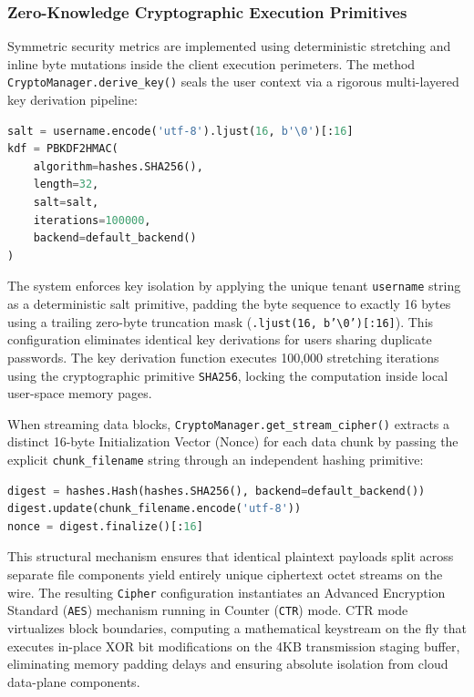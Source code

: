 \subsubsection{Zero-Knowledge Cryptographic Execution Primitives}
Symmetric security metrics are implemented using deterministic stretching and inline byte mutations inside the client execution perimeters. The method \texttt{CryptoManager.derive\_key()} seals the user context via a rigorous multi-layered key derivation pipeline:

\begin{lstlisting}[language=Python]
salt = username.encode('utf-8').ljust(16, b'\0')[:16]
kdf = PBKDF2HMAC(
    algorithm=hashes.SHA256(),
    length=32,
    salt=salt,
    iterations=100000,
    backend=default_backend()
)
\end{lstlisting}

The system enforces key isolation by applying the unique tenant \texttt{username} string as a deterministic salt primitive, padding the byte sequence to exactly 16 bytes using a trailing zero-byte truncation mask (\texttt{.ljust(16, b'\textbackslash{}0')[:16]}). This configuration eliminates identical key derivations for users sharing duplicate passwords. The key derivation function executes 100,000 stretching iterations using the cryptographic primitive \texttt{SHA256}, locking the computation inside local user-space memory pages.

When streaming data blocks, \texttt{CryptoManager.get\_stream\_cipher()} extracts a distinct 16-byte Initialization Vector (Nonce) for each data chunk by passing the explicit \texttt{chunk\_filename} string through an independent hashing primitive:

\begin{lstlisting}[language=Python]
digest = hashes.Hash(hashes.SHA256(), backend=default_backend())
digest.update(chunk_filename.encode('utf-8'))
nonce = digest.finalize()[:16]
\end{lstlisting}

This structural mechanism ensures that identical plaintext payloads split across separate file components yield entirely unique ciphertext octet streams on the wire. The resulting \texttt{Cipher} configuration instantiates an Advanced Encryption Standard (\texttt{AES}) mechanism running in Counter (\texttt{CTR}) mode. CTR mode virtualizes block boundaries, computing a mathematical keystream on the fly that executes in-place XOR bit modifications on the 4KB transmission staging buffer, eliminating memory padding delays and ensuring absolute isolation from cloud data-plane components.